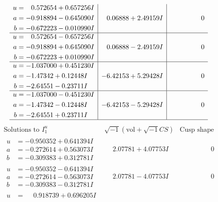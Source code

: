 \documentclass[1p]{elsarticle_modified}
\theoremstyle{definition}
\newcommand{\I}{\sqrt{-1}}
\begin{document}
$$\begin{array}{c|c|c}
\begin{aligned}
u &= \phantom{-}0.572654 + 0.657256 I \\
a &= -0.918894 - 0.645090 I \\
b &= -0.672223 - 0.010990 I\end{aligned}
 & \phantom{-}0.06888 + 2.49159 I & \phantom{-0.000000 } 0 \\ \hline\begin{aligned}
u &= \phantom{-}0.572654 - 0.657256 I \\
a &= -0.918894 + 0.645090 I \\
b &= -0.672223 + 0.010990 I\end{aligned}
 & \phantom{-}0.06888 - 2.49159 I & \phantom{-0.000000 } 0 \\ \hline\begin{aligned}
u &= -1.037000 + 0.451230 I \\
a &= -1.47342 + 0.12448 I \\
b &= -2.64551 - 0.23711 I\end{aligned}
 & -6.42153 + 5.29428 I & \phantom{-0.000000 } 0 \\ \hline\begin{aligned}
u &= -1.037000 - 0.451230 I \\
a &= -1.47342 - 0.12448 I \\
b &= -2.64551 + 0.23711 I\end{aligned}
 & -6.42153 - 5.29428 I & \phantom{-0.000000 } 0\\
 \hline 
 \end{array}$$\newpage$$\begin{array}{c|c|c}  
\text{Solutions to }I^u_{1}& \I (\text{vol} + \sqrt{-1}CS) & \text{Cusp shape}\\
 \hline 
\begin{aligned}
u &= -0.950352 + 0.641394 I \\
a &= -0.272614 + 0.563073 I \\
b &= -0.309383 + 0.312781 I\end{aligned}
 & \phantom{-}2.07781 + 4.07753 I & \phantom{-0.000000 } 0 \\ \hline\begin{aligned}
u &= -0.950352 - 0.641394 I \\
a &= -0.272614 - 0.563073 I \\
b &= -0.309383 - 0.312781 I\end{aligned}
 & \phantom{-}2.07781 - 4.07753 I & \phantom{-0.000000 } 0 \\ \hline\begin{aligned}
u &= \phantom{-}0.918739 + 0.696205 I \\

\end{aligned}
\end{array}$$
\end{document}
